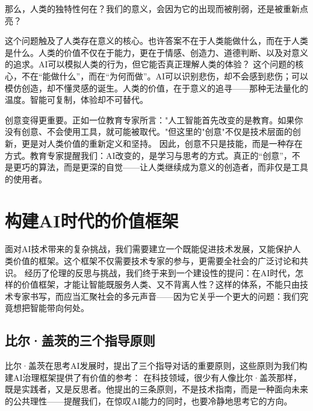 那么，人类的独特性何在？我们的意义，会因为它的出现而被削弱，还是被重新点亮？

这个问题触及了人类存在意义的核心。也许答案不在于人类能做什么，而在于人类是什么。人类的价值不仅在于能力，更在于情感、创造力、道德判断、以及对意义的追求。AI可以模拟人类的行为，但它能否真正理解人类的体验？
这个问题的核心，不在“能做什么”，而在“为何而做”。AI可以识别悲伤，却不会感到悲伤；可以模仿创造，却不懂灵感的诞生。人类的价值，在于意义的追寻——那种无法量化的温度。智能可复制，体验却不可替代。

创意变得更重要。正如一位教育专家所言："人工智能首先改变的是教育。如果你没有创意、不会使用工具，就可能被取代。"但这里的"创意"不仅是技术层面的创新，更是对人类价值的重新定义和坚持。
因此，创意不只是技能，而是一种存在方式。教育专家提醒我们：AI改变的，是学习与思考的方式。真正的“创意”，不是更巧的算法，而是更深的自觉——让人类继续成为意义的创造者，而非仅是工具的使用者。

\section{构建AI时代的价值框架}

面对AI技术带来的复杂挑战，我们需要建立一个既能促进技术发展，又能保护人类价值的框架。这个框架不仅需要技术专家的参与，更需要全社会的广泛讨论和共识。
经历了伦理的反思与挑战，我们终于来到一个建设性的提问：在AI时代，怎样的价值框架，才能让智能既服务人类、又不背离人性？这样的体系，不能只由技术专家书写，而应当汇聚社会的多元声音——因为它关乎一个更大的问题：我们究竟想把智能带向何处。

\subsection{比尔·盖茨的三个指导原则}

比尔·盖茨在思考AI发展时，提出了三个指导对话的重要原则，这些原则为我们构建AI治理框架提供了有价值的参考：
在科技领域，很少有人像比尔·盖茨那样，既是实践者，又是反思者。他提出的三条原则，不是技术指南，而是一种面向未来的公共理性——提醒我们，在惊叹AI能力的同时，也要冷静地思考它的方向。

